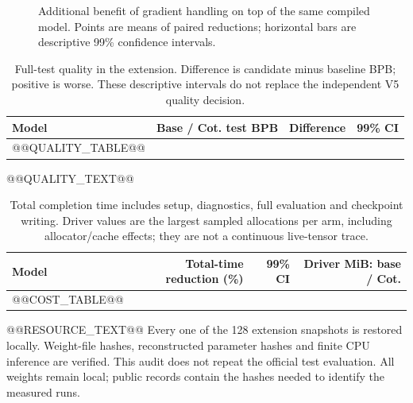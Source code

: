 \documentclass[11pt]{article}
\begin{document}
\begin{figure}[t]
\centering
{}
\caption{Additional benefit of gradient handling on top of the same compiled
model. Points are means of paired reductions; horizontal bars are descriptive
99\% confidence intervals.}
\label{fig:breadth}
\end{figure}

\begin{table}[t]
\centering
\small
\begin{tabular}{lrrr}
\toprule
Model & Base / Cot. test BPB & Difference & 99\% CI\\
\midrule
@@QUALITY_TABLE@@
\bottomrule
\end{tabular}
\caption{Full-test quality in the extension. Difference is candidate minus
baseline BPB; positive is worse. These descriptive intervals do not replace
the independent V5 quality decision.}
\label{tab:quality}
\end{table}

@@QUALITY_TEXT@@
\begin{table}[t]
\centering
\small
\begin{tabular}{lrrr}
\toprule
Model & Total-time reduction (\%) & 99\% CI & Driver MiB: base / Cot.\\
\midrule
@@COST_TABLE@@
\bottomrule
\end{tabular}
\caption{Total completion time includes setup, diagnostics, full evaluation and
checkpoint writing. Driver values are the largest sampled allocations per arm,
including allocator/cache effects; they are not a continuous live-tensor trace.}
\label{tab:cost}
\end{table}
@@RESOURCE_TEXT@@
Every one of the 128 extension snapshots is restored locally. Weight-file
hashes, reconstructed parameter hashes and finite CPU inference are verified.
This audit does not repeat the official test evaluation. All weights remain
local; public records contain the hashes needed to identify the measured runs.
\end{document}
